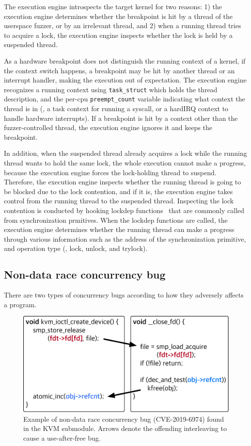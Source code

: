The execution engine introspects the target kernel for two reasons: 1)
the execution engine determines whether the breakpoint is hit by a
thread of the userspace fuzzer, or by an irrelevant thread, and 2)
when a running thread tries to acquire a lock, the execution engine
inspects whether the lock is held by a suspended thread.

As a hardware breakpoint does not distinguish the running context of a
kernel, if the context switch happens, a breakpoint may be hit by
another thread or an interrupt handler, making the execution out of
expectation.
%
The execution engine recognizes a running context using
\texttt{task_struct} which holds the thread description, and the
per-cpu \texttt{preempt_count} variable indicating what context the
thread is in (\eg, a task context for running a syscall, or a hardIRQ
context to handle hardware interrupts).
%
If a breakpoint is hit by a context other than the fuzzer-controlled
thread, the execution engine ignores it and keeps the breakpoint.


In addition, when the suspended thread already acquires a lock while
the running thread wants to hold the same lock, the whole execution
cannot make a progress, because the execution engine forces the
lock-holding thread to suspend.
%
Therefore, the execution engine inspects whether the running thread is
going to be blocked due to the lock contention, and if it is, the
execution engine takes control from the running thread to the
suspended thread.
%
Inspecting the lock contention is conducted by hooking lockdep
functions~\cite{lockdep} that are commonly called from synchronization
prmitives.
%
When the lockdep functions are called, the execution engine determines
whether the running thread can make a progress through various
information such as the address of the synchronization primitive, and
operation type (\ie, lock, unlock, and trylock).

\subsection{Non-data race concurrency bug}
\label{s:appendix:datarace}

There are two types of concurrency bugs according to how they
adversely affects a program.

\begin{figure}
  \centering
  \includegraphics[width=0.85\linewidth]{fig/racecondition.pdf}
  \caption{Example of non-data race concurrency bug (CVE-2019-6974)
    found in the KVM submodule. Arrows denote the offending
    interleaving to cause a use-after-free bug.}
  \label{fig:concurrencybugs}
\end{figure}


